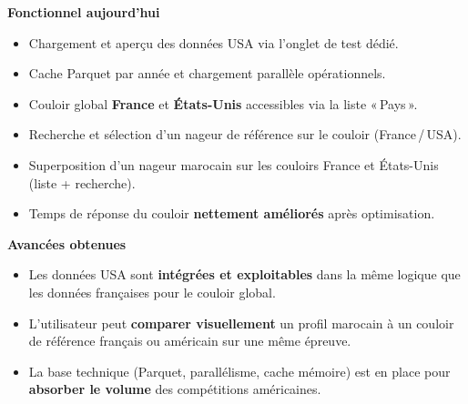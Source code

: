 \documentclass[11pt,a4paper]{article}
\begin{document}
\textbf{Fonctionnel aujourd'hui}
\begin{itemize}
  \item Chargement et aperçu des données USA via l'onglet de test dédié.
  \item Cache Parquet par année et chargement parallèle opérationnels.
  \item Couloir global \textbf{France} et \textbf{États-Unis} accessibles via la liste «\,Pays\,».
  \item Recherche et sélection d'un nageur de référence sur le couloir (France\,/\,USA).
  \item Superposition d'un nageur marocain sur les couloirs France et États-Unis (liste + recherche).
  \item Temps de réponse du couloir \textbf{nettement améliorés} après optimisation.
\end{itemize}

\textbf{Avancées obtenues}
\begin{itemize}
  \item Les données USA sont \textbf{intégrées et exploitables} dans la même logique que les données françaises pour le couloir global.
  \item L'utilisateur peut \textbf{comparer visuellement} un profil marocain à un couloir de référence français ou américain sur une même épreuve.
  \item La base technique (Parquet, parallélisme, cache mémoire) est en place pour \textbf{absorber le volume} des compétitions américaines.
\end{itemize}


\vfill
\end{document}
